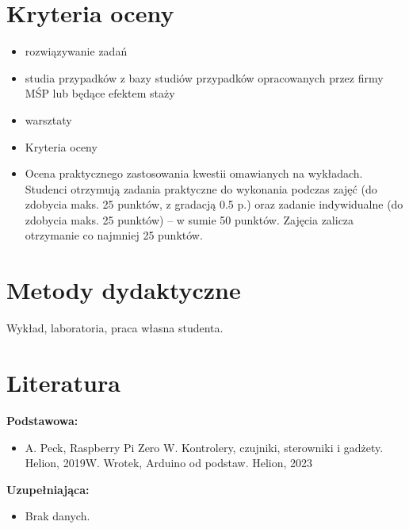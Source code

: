 \documentclass[12pt, a4paper]{article}
\begin{document}
\section{Kryteria oceny}

\begin{itemize}
  \item rozwiązywanie zadań
  \item studia przypadków z bazy studiów przypadków opracowanych przez firmy MŚP lub będące efektem staży
  \item warsztaty
  \item Kryteria oceny
  \item Ocena praktycznego zastosowania kwestii omawianych na wykładach. Studenci otrzymują zadania praktyczne do wykonania podczas zajęć (do zdobycia maks. 25 punktów, z gradacją 0.5 p.) oraz zadanie indywidualne (do zdobycia maks. 25 punktów) – w sumie 50 punktów. Zajęcia zalicza otrzymanie co najmniej 25 punktów.
\end{itemize}

\section{Metody dydaktyczne}

Wykład, laboratoria, praca własna studenta.

\section{Literatura}

\textbf{Podstawowa:}
\begin{itemize}
  \item A. Peck, Raspberry Pi Zero W. Kontrolery, czujniki, sterowniki i gadżety. Helion, 2019W. Wrotek, Arduino od podstaw. Helion, 2023
\end{itemize}

\textbf{Uzupełniająca:}
\begin{itemize}
  \item Brak danych.
\end{itemize}
\end{document}
